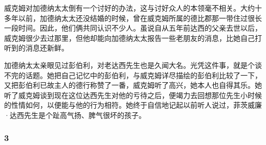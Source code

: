 \par 威克姆对加德纳太太倒有一个讨好的办法，这与讨好众人的本领毫不相关。大约十多年以前，加德纳太太还没结婚的时候，曾在威克姆所属的德比郡那一带住过很长一段时间。因此，他们俩共同认识不少人。虽说自从五年前达西的父亲去世以后，威克姆很少去过那里，但他却能向加德纳太太报告一些老朋友的消息，比她自己打听到的消息还新鲜。
\par 加德纳太太亲眼见过彭伯利，对老达西先生也是久闻大名。光凭这件事，就是个谈不完的话题。她把自己记忆中的彭伯利，与威克姆详尽描绘的彭伯利比较了一下，又把彭伯利已故主人的德行称赞了一番，威克姆听了高兴，她本人也自得其乐。她听了威克姆谈到现在这位达西先生对他的亏待之后，便竭力去回想那位先生小时候的性情如何，以便能与他的行为相符。她终于自信地记起以前听人说过，菲茨威廉·达西先生是个趾高气扬、脾气很坏的孩子。




\subsubsection*{3}



